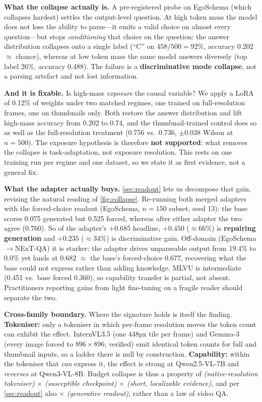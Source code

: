 \documentclass[10pt,twocolumn,letterpaper]{article}
\begin{document}
\noindent\textbf{What the collapse actually is.} A pre-registered probe on EgoSchema (which collapses hardest) settles the output-level question. At high token mass the model does not lose the ability to parse---it emits a valid choice on almost every question---but stops \emph{conditioning} that choice on the question: the answer distribution collapses onto a single label (``C'' on $458/500{=}92\%$, accuracy 0.202 $\approx$ chance), whereas at low token mass the same model answers diversely (top label 26\%, accuracy 0.488). The failure is a \textbf{discriminative mode collapse}, not a parsing artefact and not lost information.

\noindent\textbf{And it is fixable.} Is high-mass \emph{exposure} the causal variable? We apply a LoRA~\cite{hu2022lora} of 0.12\% of weights under two matched regimes, one trained on full-resolution frames, one on thumbnails only. Both restore the answer distribution and lift high-mass accuracy from 0.202 to 0.74, and the thumbnail-trained control does so as well as the full-resolution treatment (0.756 vs.\ 0.736, $\pm0.038$ Wilson at $n{=}500$). The exposure hypothesis is therefore \textbf{not supported}: what removes the collapse is task-adaptation, not exposure resolution. This rests on one training run per regime and one dataset, so we state it as first evidence, not a general fix.

\noindent\textbf{What the adapter actually buys.} \cref{sec:readout} lets us decompose that gain, revising the natural reading of \cref{fig:collapse}. Re-running both merged adapters with the forced-choice readout (EgoSchema, $n{=}150$ subset, seed 13): the base scores 0.075 generated but 0.525 forced, whereas after either adapter the two agree (0.760). So of the adapter's $+0.685$ headline, $+0.450$ ($\approx66\%$) is \textbf{repairing generation} and $+0.235$ ($\approx34\%$) is discriminative gain. Off-domain (EgoSchema$\to$NExT-QA) it is starker: the adapter drives unparseable output from 19.4\% to 0.0\% yet lands at 0.682 $\approx$ the base's forced-choice 0.677, recovering what the base could not express rather than adding knowledge. MLVU is intermediate (0.451 vs.\ base forced 0.360), so capability transfer is partial, not absent. Practitioners reporting gains from light fine-tuning on a fragile reader should separate the two.

\noindent\textbf{Cross-family boundary.} Where the signature holds is itself the finding. \textbf{Tokeniser:} only a tokeniser in which per-frame resolution moves the token count can exhibit the effect. InternVL3.5 (one 448px tile per frame) and Gemma-3 (every image forced to $896{\times}896$; verified) emit identical token counts for full and thumbnail inputs, so a ladder there is null by construction. \textbf{Capability:} within the tokeniser that \emph{can} express it, the effect is strong at Qwen2.5-VL-7B and \emph{reverses} at Qwen3-VL-8B. Budget collapse is thus a property of \emph{(native-resolution tokeniser)} $\times$ \emph{(susceptible checkpoint)} $\times$ \emph{(short, localizable evidence)}, and per \cref{sec:readout} also $\times$ \emph{(generative readout)}, rather than a law of video QA.
\end{document}
